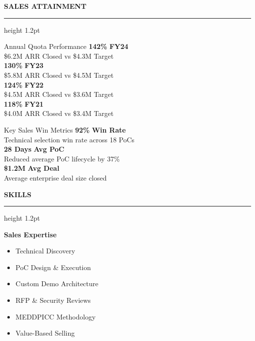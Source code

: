 \documentclass[10pt]{article}
\newcommand{\sectionheader}[1]{%
  \vspace{8pt}%
  {\color{primary}\fontfamily{phv}\selectfont\large\bfseries\MakeUppercase{#1}}%
  \vspace{2pt}%
  {\color{accent}\hrule height 1.2pt}%
  \vspace{4pt}%
}
\begin{document}
\hfill%
\begin{minipage}[t]{0.34\textwidth}
  \sectionheader{Sales Attainment}
  
  \begin{metricbox}{Annual Quota Performance}
    \textbf{\color{accent}\large 142\%} \hfill \textbf{FY24}\\
    {\color{secondary}\scriptsize \$6.2M ARR Closed vs \$4.3M Target}\\[4pt]
    \textbf{\color{accent}\large 130\%} \hfill \textbf{FY23}\\
    {\color{secondary}\scriptsize \$5.8M ARR Closed vs \$4.5M Target}\\[4pt]
    \textbf{\color{accent}\large 124\%} \hfill \textbf{FY22}\\
    {\color{secondary}\scriptsize \$4.5M ARR Closed vs \$3.6M Target}\\[4pt]
    \textbf{\color{accent}\large 118\%} \hfill \textbf{FY21}\\
    {\color{secondary}\scriptsize \$4.0M ARR Closed vs \$3.4M Target}
  \end{metricbox}
  
  \vspace{6pt}
  
  \begin{metricbox}{Key Sales Win Metrics}
    \textbf{\color{accent}\large 92\%} \hfill \textbf{Win Rate}\\
    {\color{secondary}\scriptsize Technical selection win rate across 18 PoCs}\\[4pt]
    \textbf{\color{accent}\large 28 Days} \hfill \textbf{Avg PoC}\\
    {\color{secondary}\scriptsize Reduced average PoC lifecycle by 37\%}\\[4pt]
    \textbf{\color{accent}\large \$1.2M} \hfill \textbf{Avg Deal}\\
    {\color{secondary}\scriptsize Average enterprise deal size closed}
  \end{metricbox}

  \sectionheader{Skills}
  \textbf{Sales Expertise}\\
  \begin{itemize}
    \item Technical Discovery
    \item PoC Design \& Execution
    \item Custom Demo Architecture
    \item RFP \& Security Reviews
    \item MEDDPICC Methodology
    \item Value-Based Selling
  \end{itemize}
  

\end{minipage}
\end{document}
